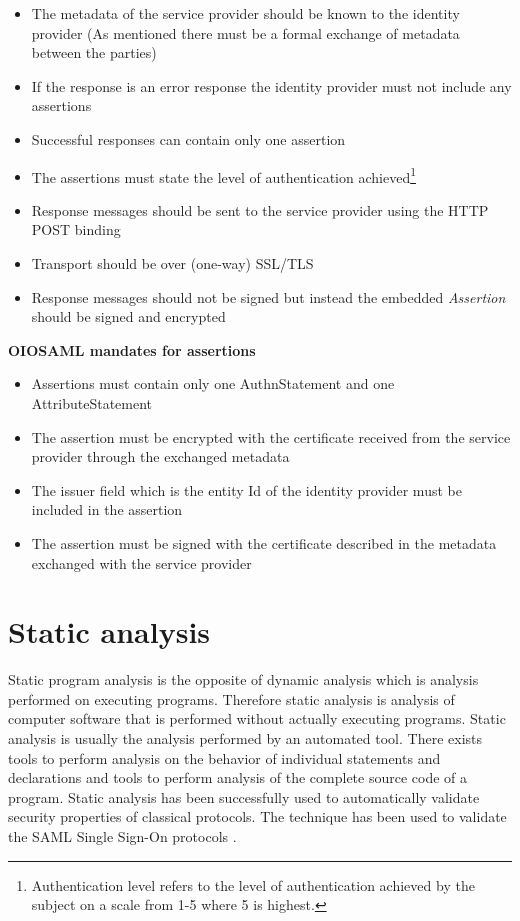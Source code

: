\documentclass[twosided]{report}
\begin{document}
\begin{itemize}
  \item The metadata of the service provider should be known to the identity provider (As mentioned there must be a formal exchange of metadata between the parties)
  \item If the response is an error response the identity provider must not include any assertions
  \item Successful responses can contain only one assertion
  \item The assertions must state the level of authentication achieved\footnote{Authentication level refers to the level of authentication achieved by the subject on a scale from 1-5 where 5 is highest.}
  \item Response messages should be sent to the service provider using the HTTP POST binding
  \item Transport should be over (one-way) SSL/TLS
  \item Response messages should not be signed but instead the embedded \emph{Assertion} should be signed and encrypted
\end{itemize}
\textbf{OIOSAML mandates for assertions}
\begin{itemize}
  \item Assertions must contain only one AuthnStatement and one AttributeStatement
  \item The assertion must be encrypted with the certificate received from the service provider through the exchanged metadata
  \item The issuer field which is the entity Id of the identity provider must be included in the assertion
  \item The assertion must be signed with the certificate described in the metadata exchanged with the service provider
\end{itemize}
\section{Static analysis}
Static program analysis is the opposite of dynamic analysis which is analysis performed on executing programs. Therefore static analysis is analysis of computer software that is performed without actually executing programs. Static analysis is usually the analysis performed by an automated tool. There exists tools to perform analysis on the behavior of individual statements and declarations and tools to perform analysis of the complete source code of a program. Static analysis has been successfully used to automatically validate security properties of classical protocols. The technique has been used to validate the SAML Single Sign-On protocols \cite{HansenSkriver}.
\end{document}
